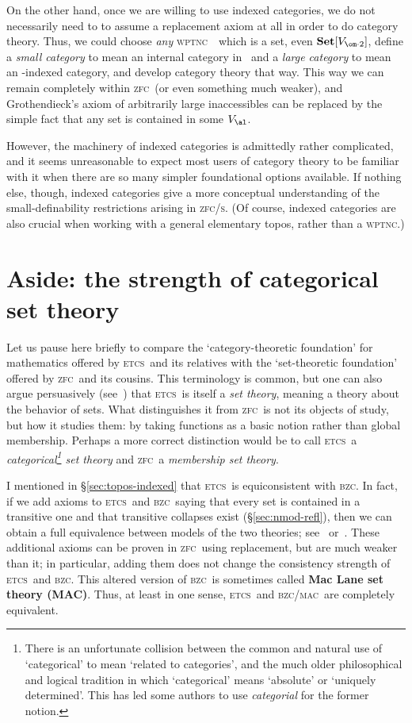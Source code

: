 \documentclass{amsart}
\newcommand{\Set}{\ensuremath{\mathbf{Set}}}
\def\zfc{\textsc{zfc}}
\def\zfcs{\textsc{zfc/s}}
\def\wptnc{\textsc{wptnc}}
\def\etcs{\textsc{etcs}}
\def\bzc{\textsc{bzc}}
\def\mac{\textsc{mac}}
\begin{document}
On the other hand, once we are willing to use indexed categories, we
do not necessarily need to to assume a replacement axiom at all in
order to do category theory.  Thus, we could choose \emph{any} \wptnc\
\bS\ which is a set, even $\Set[V_{\om\cdot 2}]$, define a \emph{small
  category} to mean an internal category in \bS\ and a \emph{large
  category} to mean an \bS-indexed category, and develop category
theory that way.  This way we can remain completely within \zfc\ (or
even something much weaker), and Grothendieck's axiom of arbitrarily
large inaccessibles can be replaced by the simple fact that any set is
contained in some $V_\al$.

However, the machinery of indexed categories is admittedly rather
complicated, and it seems unreasonable to expect most users of
category theory to be familiar with it when there are so many simpler
foundational options available.  If nothing else, though, indexed
categories give a more conceptual understanding of the
small-definability restrictions arising in \zfcs.  (Of course, indexed
categories are also crucial when working with a general elementary
topos, rather than a \wptnc.)


\section{Aside: the strength of categorical set theory}
\label{sec:cst}

Let us pause here briefly to compare the `category-theoretic
foundation' for mathematics offered by \etcs\ and its relatives with
the `set-theoretic foundation' offered by \zfc\ and its cousins.  This
terminology is common, but one can also argue persuasively
(see~\cite{lawvere:etcs-long}) that \etcs\ is itself a \emph{set
  theory}, meaning a theory about the behavior of sets.  What
distinguishes it from \zfc\ is not its objects of study, but how it
studies them: by taking functions as a basic notion rather than global
membership.  Perhaps a more correct distinction would be to call
\etcs\ a \emph{categorical\footnote{There is an unfortunate collision
    between the common and natural use of `categorical' to mean
    `related to categories', and the much older philosophical and
    logical tradition in which `categorical' means `absolute' or
    `uniquely determined'.  This has led some authors to use
    \emph{categorial} for the former notion.} set theory} and \zfc\ a
\emph{membership set theory}.

I mentioned in \S\ref{sec:topos-indexed} that \etcs\ is equiconsistent
with \bzc.  In fact, if we add axioms to \etcs\ and \bzc\ saying that
every set is contained in a transitive one and that transitive
collapses exist (\S\ref{sec:nmod-refl}), then we can obtain a full
equivalence between models of the two theories;
see~\cite[Ch.~9]{ptj:topos-theory} or~\cite{osius:cat-setth}.  These
additional axioms can be proven in \zfc\ using replacement, but are
much weaker than it; in particular, adding them does not change the
consistency strength of \etcs\ and \bzc.  This altered version of
\bzc\ is sometimes called \textbf{Mac Lane set theory (MAC)}.  Thus,
at least in one sense, \etcs\ and \bzc/\mac\ are completely
equivalent.
\end{document}
